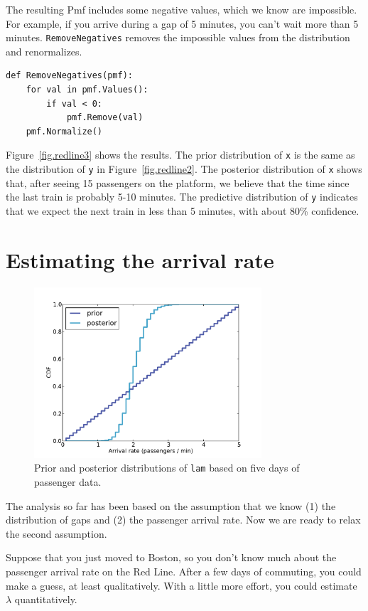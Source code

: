 \documentclass[12pt]{book}
\begin{document}
The resulting Pmf includes some negative values, which we know are
impossible.  For example, if you arrive during a gap of 5 minutes, you
can't wait more than 5 minutes.  {\tt RemoveNegatives} removes the
impossible values from the distribution and renormalizes.

\begin{verbatim}
def RemoveNegatives(pmf):
    for val in pmf.Values():
        if val < 0:
            pmf.Remove(val)
    pmf.Normalize()
\end{verbatim}

Figure~\ref{fig.redline3} shows the results.  The prior distribution
of {\tt x} is the same as the distribution of {\tt y} in
Figure~\ref{fig.redline2}.  The posterior distribution of {\tt x} shows that,
after seeing 15 passengers on the platform, we believe that the time
since the last train is probably 5-10 minutes.  
The predictive distribution of {\tt y} indicates that
we expect the next train in less than 5 minutes,
with about 80\% confidence.


\section{Estimating the arrival rate}

\begin{figure}
\centerline{\includegraphics[height=2.5in]{figs/redline1.pdf}}
\caption{Prior and posterior distributions of {\tt lam} based
on five days of passenger data. }
\label{fig.redline1}
\end{figure}

The analysis so far has been based on the assumption that we know (1)
the distribution of gaps and (2) the passenger arrival rate.  Now we
are ready to relax the second assumption.

Suppose that you just moved to Boston, so you don't know much about
the passenger arrival rate on the Red Line.  After a few days of
commuting, you could make a guess, at least qualitatively.  With
a little more effort, you could estimate $\lambda$ quantitatively.
\end{document}
